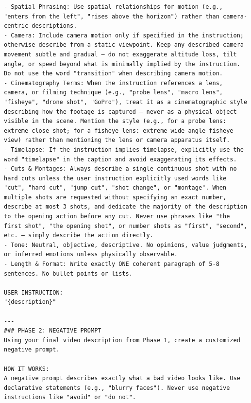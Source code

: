 \documentclass{llmxive}
\begin{document}
\begin{tcolorbox}
\begin{Verbatim}[breaklines=true,breakanywhere=true,fontsize=\scriptsize]
- Spatial Phrasing: Use spatial relationships for motion (e.g., "enters from the left", "rises above the horizon") rather than camera-centric descriptions.
- Camera: Include camera motion only if specified in the instruction; otherwise describe from a static viewpoint. Keep any described camera movement subtle and gradual — do not exaggerate altitude loss, tilt angle, or speed beyond what is minimally implied by the instruction. Do not use the word "transition" when describing camera motion.
- Cinematography Terms: When the instruction references a lens, camera, or filming technique (e.g., "probe lens", "macro lens", "fisheye", "drone shot", "GoPro"), treat it as a cinematographic style describing how the footage is captured — never as a physical object visible in the scene. Mention the style (e.g., for a probe lens: extreme close shot; for a fisheye lens: extreme wide angle fisheye view) rather than mentioning the lens or camera apparatus itself.
- Timelapse: If the instruction implies timelapse, explicitly use the word "timelapse" in the caption and avoid exaggerating its effects.
- Cuts & Montages: Always describe a single continuous shot with no hard cuts unless the user instruction explicitly used words like "cut", "hard cut", "jump cut", "shot change", or "montage". When multiple shots are requested without specifying an exact number, describe at most 3 shots, and dedicate the majority of the description to the opening action before any cut. Never use phrases like "the first shot", "the opening shot", or number shots as "first", "second", etc. — simply describe the action directly.
- Tone: Neutral, objective, descriptive. No opinions, value judgments, or inferred emotions unless physically observable.
- Length & Format: Write exactly ONE coherent paragraph of 5-8 sentences. No bullet points or lists.

USER INSTRUCTION:
"{description}"

---
### PHASE 2: NEGATIVE PROMPT
Using your final video description from Phase 1, create a customized negative prompt.

HOW IT WORKS:
A negative prompt describes exactly what a bad video looks like. Use declarative statements (e.g., "blurry faces"). Never use negative instructions like "avoid" or "do not".


\end{Verbatim}
\end{tcolorbox}
\end{document}

